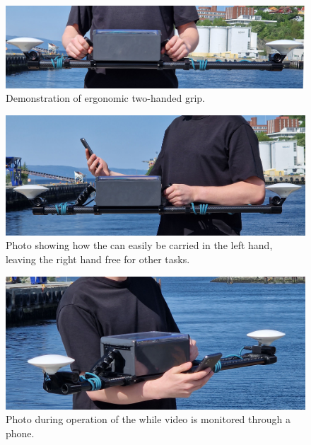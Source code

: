 \begin{figure}[H]
    \centering
    \includegraphics[width=\textwidth]{figures/ergonomics/dual_from_front.jpg}
    \caption{Demonstration of ergonomic two-handed grip.}
    \label{fig:egonomics_a}
\end{figure}
\begin{figure}[H]
    \centering
    \includegraphics[width=\textwidth]{figures/ergonomics/single_hand.jpg}
    \caption{Photo showing how the \sr can easily be carried in the left hand, leaving the right hand free for other tasks.}
    \label{fig:egonomics_b}
\end{figure}
\begin{figure}[H]
    \centering
    \includegraphics[width=\textwidth]{figures/ergonomics/holding_phone.jpg}
    \caption{Photo during operation of the \sr while video is monitored through a phone.}
    \label{fig:egonomics_c}
\end{figure}
